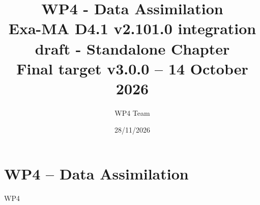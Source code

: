 \documentclass[11pt]{report}
\begin{document}
\title{WP4 - Data Assimilation\\
\large Exa-MA D4.1 v2.101.0 integration draft - Standalone Chapter\\
\normalsize Final target v3.0.0 -- 14 October 2026}
\author{WP4 Team}
\date{28/11/2026}
\maketitle

\tableofcontents
\clearpage

\chapter{WP4 -- Data Assimilation}
\label{chap:wp4}
{WP4}
\clearpage


\end{document}
